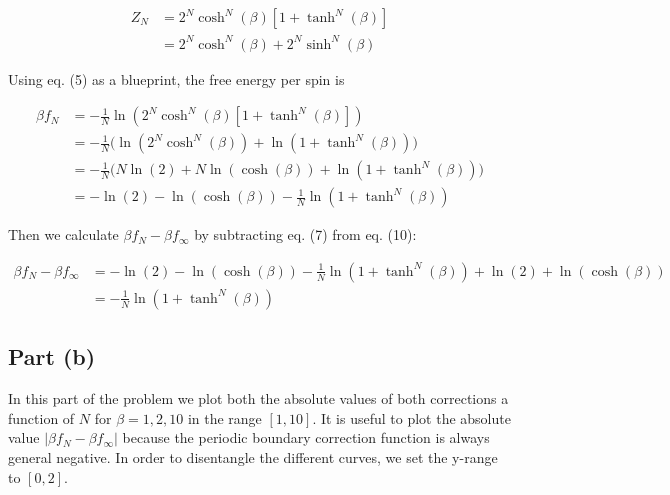 ﻿\documentclass[11pt]{article}
\begin{document}
\[
\begin{aligned}
Z_N &= 2^N\cosh^N(\beta)\left[1+\tanh^N(\beta)\right]\\
&= 2^N\cosh^N(\beta)+2^N\sinh^N(\beta)
\end{aligned} \tag{9}
\]

Using eq. (5) as a blueprint, the free energy per spin is

\[
\begin{aligned}
\beta f_N &= -\frac{1}{N}\ln\left(2^N\cosh^N(\beta)\left[1+\tanh^N(\beta)\right]\right)\\
&= -\frac{1}{N}\Big(\ln\left(2^N\cosh^N(\beta)\right)+\ln\left(1+\tanh^N(\beta)\right)\Big)\\
&= -\frac{1}{N}\Big(N\ln(2)+N\ln(\cosh(\beta))+\ln\left(1+\tanh^N(\beta)\right)\Big)\\
&= -\ln(2)-\ln(\cosh(\beta))-\frac{1}{N}\ln\left(1+\tanh^N(\beta)\right)
\end{aligned} \tag{10}
\]

Then we calculate \(\beta f_N - \beta f_{\infty}\) by subtracting eq.
(7) from eq. (10):

\[
\begin{aligned}
\beta f_N - \beta f_{\infty} &= -\ln(2)-\ln(\cosh(\beta))-\frac{1}{N}\ln\left(1+\tanh^N(\beta)\right)+\ln(2)+\ln(\cosh(\beta))\\
&= \boxed{-\frac{1}{N}\ln\left(1+\tanh^N(\beta)\right)}
\end{aligned} \tag{11}
\]

    \subsection*{Part (b)}

In this part of the problem we plot both the absolute values of both
corrections a function of \(N\) for \(\beta = 1, 2, 10\) in the range
\([1, 10]\). It is useful to plot the absolute value
\(|\beta f_N - \beta f_{\infty}|\) because the periodic boundary
correction function is always general negative. In order to disentangle
the different curves, we set the y-range to \([0, 2]\).
\end{document}
